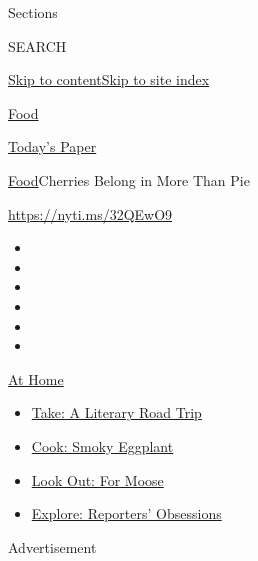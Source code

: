 Sections

SEARCH

\protect\hyperlink{site-content}{Skip to
content}\protect\hyperlink{site-index}{Skip to site index}

\href{https://www.nytimes.com/section/food}{Food}

\href{https://myaccount.nytimes.com/auth/login?response_type=cookie\&client_id=vi}{}

\href{https://www.nytimes.com/section/todayspaper}{Today's Paper}

\href{/section/food}{Food}\textbar{}Cherries Belong in More Than Pie

\url{https://nyti.ms/32QEwO9}

\begin{itemize}
\item
\item
\item
\item
\item
\item
\end{itemize}

\href{https://www.nytimes.com/spotlight/at-home?action=click\&pgtype=Article\&state=default\&region=TOP_BANNER\&context=at_home_menu}{At
Home}

\begin{itemize}
\tightlist
\item
  \href{https://www.nytimes.com/2020/07/28/books/time-for-a-literary-road-trip.html?action=click\&pgtype=Article\&state=default\&region=TOP_BANNER\&context=at_home_menu}{Take:
  A Literary Road Trip}
\item
  \href{https://www.nytimes.com/2020/07/29/magazine/bored-with-your-home-cooking-some-smoky-eggplant-will-fix-that.html?action=click\&pgtype=Article\&state=default\&region=TOP_BANNER\&context=at_home_menu}{Cook:
  Smoky Eggplant}
\item
  \href{https://www.nytimes.com/2020/07/27/travel/moose-michigan-isle-royale.html?action=click\&pgtype=Article\&state=default\&region=TOP_BANNER\&context=at_home_menu}{Look
  Out: For Moose}
\item
  \href{https://www.nytimes.com/interactive/2020/at-home/even-more-reporters-editors-diaries-lists-recommendations.html?action=click\&pgtype=Article\&state=default\&region=TOP_BANNER\&context=at_home_menu}{Explore:
  Reporters' Obsessions}
\end{itemize}

Advertisement


